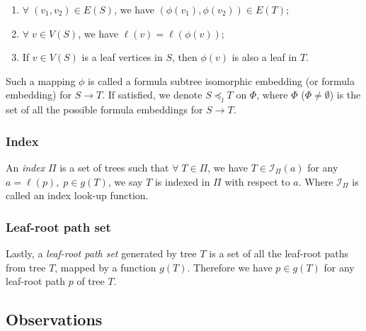 \begin{enumerate}
\item 
$\forall\; (v_1,v_2) \in E(S)$, we have $(\phi(v_1),\phi(v_2)) \in E(T)$;
\item
$\forall\; v \in V(S)$, we have $\ell(v) = \ell(\phi(v))$;
\item
If $v \in V(S)$ is a leaf vertices in $S$, then $\phi(v)$ is also a leaf in $T$.
\end{enumerate}
Such a mapping $\phi$ is called a formula subtree isomorphic embedding (or formula embedding) for $S \rightarrow T$. 
If satisfied, we denote $S \preceq_l T$ on $\Phi$, where $\Phi$ ($\Phi \neq \emptyset$) is the set of all the possible formula embeddings for $S \rightarrow T$.

\subsubsection{Index}
An \textit{index} $\Pi$ is a set of trees such that $\forall\; T \in \Pi$, we have $T \in \mathcal{I}_{\Pi}(a)$ for any $a = \ell(p), \; p \in g(T)$, we say $T$ is indexed in $\Pi$ with respect to $a$.
Where $\mathcal{I}_{\Pi}$ is called an index look-up function. 

\subsubsection{Leaf-root path set}
Lastly, a \textit{leaf-root path set} generated by tree $T$ is a set of all the leaf-root paths from tree $T$, mapped by a function $g(T)$. Therefore we have $p \in g(T)$ for any leaf-root path $p$ of tree $T$.


\subsection{Observations}
\label{observationlabel}
